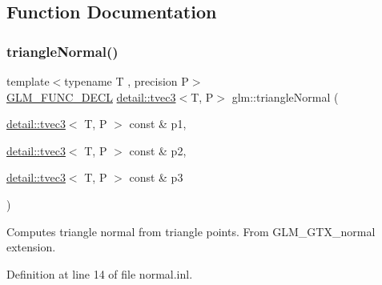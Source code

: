 \subsection{Function Documentation}
\mbox{\label{group__gtx__normal_gadd95b70793270eaeec13e2e8788b71d2}} 
\subsubsection{\texorpdfstring{triangle\+Normal()}{triangleNormal()}}
{\footnotesize\ttfamily template$<$typename T , precision P$>$ \\
\hyperlink{setup_8hpp_ab2d052de21a70539923e9bcbf6e83a51}{G\+L\+M\+\_\+\+F\+U\+N\+C\+\_\+\+D\+E\+CL} \hyperlink{structglm_1_1detail_1_1tvec3}{detail\+::tvec3}$<$T, P$>$ glm\+::triangle\+Normal (\begin{DoxyParamCaption}\item[{\hyperlink{structglm_1_1detail_1_1tvec3}{detail\+::tvec3}$<$ T, P $>$ const \&}]{p1,  }\item[{\hyperlink{structglm_1_1detail_1_1tvec3}{detail\+::tvec3}$<$ T, P $>$ const \&}]{p2,  }\item[{\hyperlink{structglm_1_1detail_1_1tvec3}{detail\+::tvec3}$<$ T, P $>$ const \&}]{p3 }\end{DoxyParamCaption})}

Computes triangle normal from triangle points. From G\+L\+M\+\_\+\+G\+T\+X\+\_\+normal extension. 

Definition at line 14 of file normal.\+inl.

